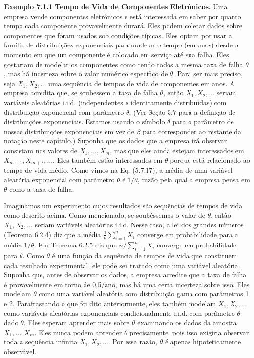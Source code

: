 \noindent\textbf{Exemplo 7.1.1} \quad \textbf{Tempo de Vida de Componentes Eletrônicos.} Uma empresa vende componentes eletrônicos e está interessada em saber por quanto tempo cada componente provavelmente durará. Eles podem coletar dados sobre componentes que foram usados sob condições típicas. Eles optam por usar a família de distribuições exponenciais para modelar o tempo (em anos) desde o momento em que um componente é colocado em serviço até sua falha. Eles gostariam de modelar os componentes como tendo todos a mesma taxa de falha $\theta$, mas há incerteza sobre o valor numérico específico de $\theta$. Para ser mais preciso,
seja $X_1, X_2, \dots$ uma sequência de tempos de vida de componentes em anos. A empresa acredita que, se soubessem a taxa de falha $\theta$, então $X_1, X_2, \dots$ seriam variáveis aleatórias i.i.d. (independentes e identicamente distribuídas) com distribuição exponencial com parâmetro $\theta$. (Ver Seção 5.7 para a definição de distribuições exponenciais. Estamos usando o símbolo $\theta$ para o parâmetro de nossas distribuições exponenciais em vez de $\beta$ para corresponder ao restante da notação neste capítulo.) Suponha que os dados que a empresa irá observar consistam nos valores de $X_1, \dots, X_m$, mas que eles ainda estejam interessados em $X_{m+1}, X_{m+2}, \dots$. Eles também estão interessados em $\theta$ porque está relacionado ao tempo de vida médio. Como vimos na Eq. (5.7.17), a média de uma variável aleatória exponencial com parâmetro $\theta$ é $1/\theta$, razão pela qual a empresa pensa em $\theta$ como a taxa de falha.

Imaginamos um experimento cujos resultados são sequências de tempos de vida como descrito acima. Como mencionado, se soubéssemos o valor de $\theta$, então $X_1, X_2, \dots$ seriam variáveis aleatórias i.i.d. Nesse caso, a lei dos grandes números (Teorema 6.2.4) diz que a média $\frac{1}{n}\sum_{i=1}^{n}X_i$ converge em probabilidade para a média $1/\theta$. E o Teorema 6.2.5 diz que $n/\sum_{i=1}^{n}X_i$ converge em probabilidade para $\theta$. Como $\theta$ é uma função da sequência de tempos de vida que constituem cada resultado experimental, ele pode ser tratado como uma variável aleatória. Suponha que, antes de observar os dados, a empresa acredite que a taxa de falha é provavelmente em torno de 0,5/ano, mas há uma certa incerteza sobre isso. Eles modelam $\theta$ como uma variável aleatória com distribuição gama com parâmetros 1 e 2. Parafraseando o que foi dito anteriormente, eles também modelam $X_1, X_2, \dots$ como variáveis aleatórias exponenciais condicionalmente i.i.d. com parâmetro $\theta$ dado $\theta$. Eles esperam aprender mais sobre $\theta$ examinando os dados da amostra $X_1, \dots, X_m$. Eles nunca podem aprender $\theta$ precisamente, pois isso exigiria observar toda a sequência infinita $X_1, X_2, \dots$. Por essa razão, $\theta$ é apenas hipoteticamente observável.

